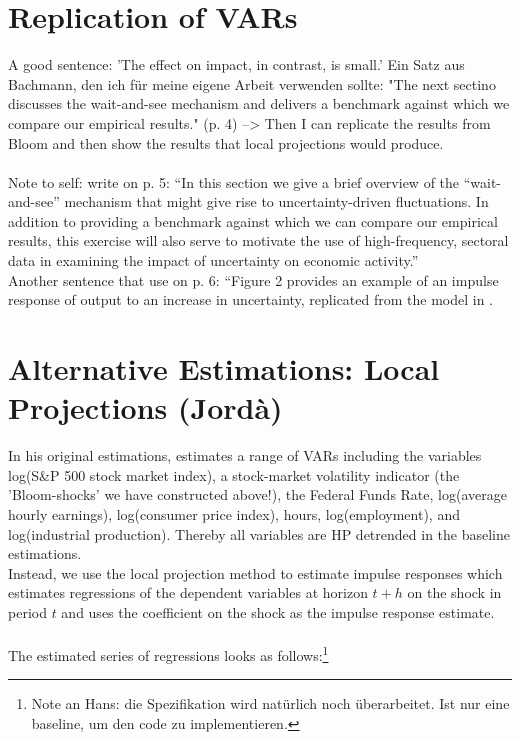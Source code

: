 \documentclass[a4paper,12pt,oneside,pointednumbers,bibtotoc,bigheadings,liststotoc]{scrbook}
\begin{document}
\section{Replication of VARs}
A good sentence: 'The effect on impact, in contrast, is small.' 
Ein Satz aus Bachmann, den ich für meine eigene Arbeit verwenden sollte: "The next sectino discusses the wait-and-see mechanism and delivers a benchmark against which we compare our empirical results." (p. 4) --> Then I can replicate the results from Bloom and then show the results that local projections would produce.\\
\\
Note to self: \citet{bachmannetal:13} write on p. 5: ``In this section we give a brief overview of the ``wait-and-see'' mechanism that might give rise to uncertainty-driven fluctuations. In addition to providing a benchmark against which we can compare our empirical results, this exercise will also serve to motivate the use of high-frequency, sectoral data in examining the impact of uncertainty on economic activity.''\\
Another sentence that \citet{bachmannetal:13} use on p. 6: ``Figure 2 provides an example of an impulse response of output to an increase in uncertainty, replicated from the model in \citet{bloom:09}.

\section{Alternative Estimations: Local Projections (Jordà)}
In his original estimations, \citet{bloom:09} estimates a range of VARs including the variables log(S\&P 500 stock market index), a stock-market volatility indicator (the 'Bloom-shocks' we have constructed above!), the Federal Funds Rate, log(average hourly earnings), log(consumer price index), hours, log(employment), and log(industrial production). Thereby all variables are HP detrended in the baseline estimations.\\
Instead, we use the \citet{jorda:05} local projection method to estimate impulse responses which estimates regressions of the dependent variables at horizon $t+h$ on the shock in period $t$ and uses the coefficient on the shock as the impulse response estimate.
\\
\\
The estimated series of regressions looks as follows:\footnote{Note an Hans: die Spezifikation wird natürlich noch überarbeitet. Ist nur eine baseline, um den code zu implementieren.}
\end{document}

